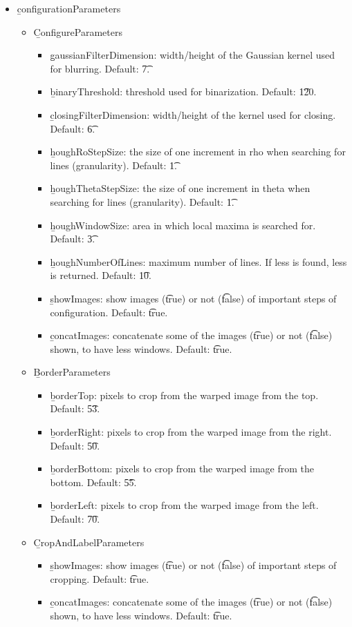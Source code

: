\begin{itemize}
    \item \b{configurationParameters}
    \begin{itemize}
        \item \b{ConfigureParameters}
        \begin{itemize}
            \item \b{gaussianFilterDimension}: width/height of the Gaussian kernel used for blurring. Default: \t{7}.
            \item \b{binaryThreshold}: threshold used for binarization. Default: \t{120}.
            \item \b{closingFilterDimension}: width/height of the kernel used for closing. Default: \t{6}.
            \item \b{houghRoStepSize}: the size of one increment in rho when searching for lines (granularity). Default: \t{1}.
            \item \b{houghThetaStepSize}: the size of one increment in theta when searching for lines (granularity). Default: \t{1}.
            \item \b{houghWindowSize}: area in which local maxima is searched for. Default: \t{3}.
            \item \b{houghNumberOfLines}: maximum number of lines. If less is found, less is returned. Default: \t{10}.
            \item \b{showImages}: show images (\t{true}) or not (\t{false}) of important steps of configuration. Default: \t{true}.
            \item \b{concatImages}: concatenate some of the images (\t{true}) or not (\t{false}) shown, to have less windows. Default: \t{true}.
        \end{itemize}
        \item \b{BorderParameters}
        \begin{itemize}
            \item \b{borderTop}: pixels to crop from the warped image from the top. Default: \t{53}.
            \item \b{borderRight}: pixels to crop from the warped image from the right. Default: \t{50}.
            \item \b{borderBottom}: pixels to crop from the warped image from the bottom. Default: \t{55}.
            \item \b{borderLeft}: pixels to crop from the warped image from the left. Default: \t{70}.
        \end{itemize}
        \item \b{CropAndLabelParameters}
        \begin{itemize}
            \item \b{showImages}: show images (\t{true}) or not (\t{false}) of important steps of cropping. Default: \t{true}.
            \item \b{concatImages}: concatenate some of the images (\t{true}) or not (\t{false}) shown, to have less windows. Default: \t{true}.
        \end{itemize}
    \end{itemize}


\end{itemize}

